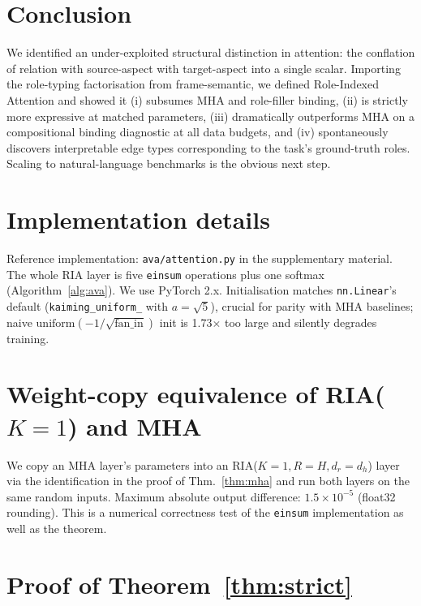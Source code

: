 \documentclass{article}
\begin{document}
\section{Conclusion}

We identified an under-exploited structural distinction in attention:
the conflation of relation with source-aspect with target-aspect into
a single scalar. Importing the role-typing factorisation from
frame-semantic, we defined Role-Indexed Attention and showed it (i)
subsumes MHA and role-filler binding, (ii) is strictly more
expressive at matched parameters, (iii) dramatically outperforms MHA
on a compositional binding diagnostic at all data budgets, and (iv)
spontaneously discovers interpretable edge types corresponding to the
task's ground-truth roles. Scaling to natural-language benchmarks is
the obvious next step.




\appendix

\section{Implementation details}
\label{app:impl}

Reference implementation: \texttt{ava/attention.py} in the supplementary
material. The whole RIA layer is five \texttt{einsum} operations plus
one softmax (Algorithm~\ref{alg:ava}). We use PyTorch 2.x. Initialisation
matches \texttt{nn.Linear}'s default (\texttt{kaiming\_uniform\_} with
$a{=}\sqrt{5}$), crucial for parity with MHA baselines; naive
$\mathrm{uniform}(-1/\sqrt{\text{fan\_in}})$ init is 1.73$\times$ too
large and silently degrades training.

\section{Weight-copy equivalence of RIA($K{=}1$) and MHA}
\label{app:reduction-mha}

We copy an MHA layer's parameters into an RIA($K{=}1, R{=}H, d_r{=}d_h$)
layer via the identification in the proof of Thm.~\ref{thm:mha} and run
both layers on the same random inputs. Maximum absolute output
difference: $1.5 \times 10^{-5}$ (float32 rounding). This is a
numerical correctness test of the \texttt{einsum} implementation as
well as the theorem.

\section{Proof of Theorem~\ref{thm:strict}}
\label{app:separation-proof}
\end{document}
